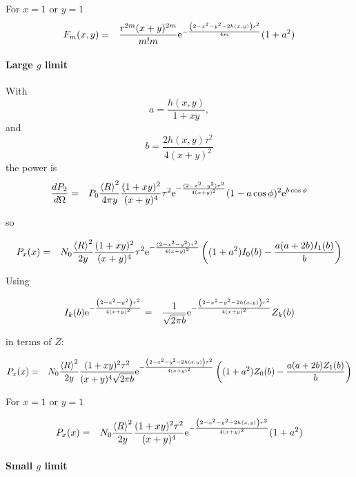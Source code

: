 \documentclass[11pt,openany]{report}
\newcommand{\der}[2]{\frac{d {#1}}{d {#2}}}
\newcommand{\e}{{\rm e}}
\begin{document}
{{For $x=1$ or $y=1$
\begin{eqnarray}
F_{m}(x,y)&=&\frac{r^{2m}(x+y)^{2m}}{m!m}\e^{-\frac{\left(2-x^{2}-y^{2}-2h(x,y)\right)s^{2}}{4m}}(1+a^{2})
\end{eqnarray}



\paragraph{Large $g$ limit}

With
$$a=\frac{h(x,y)}{1+xy},$$
and
$$b=\frac{2h(x,y)\tau^{2}}{4(x+y)^{2}}$$
the power is
\begin{eqnarray}\der{P_{2}}{\Omega}
&=&P_{0}\frac{\left<R\right>^{2}}{4\pi y}\frac{(1+xy)^{2}}{(x+y)^{4}}\tau^{2}\e^{-\frac{(2-x^{2}-y^{2})\tau^{2}}{4(x+y)^{2}}}(1-a\cos\phi)^{2}\e^{b\cos\phi}\end{eqnarray}

so

\begin{eqnarray}
P_{x}(x)&=&N_{0}\frac{\left<R\right>^{2}}{2y}\frac{(1+xy)^{2}}{(x+y)^{4}}\tau^{2}\e^{-\frac{(2-x^{2}-y^{2})\tau^{2}}{4(x+y)^{2}}}\left((1+a^{2})I_{0}(b)-\frac{a(a+2b)I_{1}(b)}{b}\right)
\end{eqnarray}

Using

\begin{eqnarray}
I_{k}(b)\e^{-\frac{\left(2-x^{2}-y^{2}\right)\tau^{2}}{4(x+y)^{2}}}&=&\frac{1}{\sqrt{2\pi b}}\e^{-\frac{\left(2-x^{2}-y^{2}-2h(x,y)\right)\tau^{2}}{4(x+y)^{2}}}Z_{k}(b)
\end{eqnarray}

in terms of $Z$:

\begin{eqnarray}
P_{x}(x)&=&N_{0}\frac{\left<R\right>^{2}}{2y}\frac{(1+xy)^{2}\tau^{2}}{(x+y)^{4}\sqrt{2\pi b}}\e^{-\frac{\left(2-x^{2}-y^{2}-2h(x,y)\right)\tau^{2}}{4(x+y)^{2}}}\left((1+a^{2})Z_{0}(b)-\frac{a(a+2b)Z_{1}(b)}{b}\right)
\end{eqnarray}

For $x=1$ or $y=1$

\begin{eqnarray}
P_{x}(x)&=&N_{0}\frac{\left<R\right>^{2}}{2y}\frac{(1+xy)^{2}\tau^{2}}{(x+y)^{4}}\e^{-\frac{\left(2-x^{2}-y^{2}-2h(x,y)\right)\tau^{2}}{4(x+y)^{2}}}(1+a^{2})
\end{eqnarray}

\paragraph{Small $g$ limit}

}}
\end{document}
